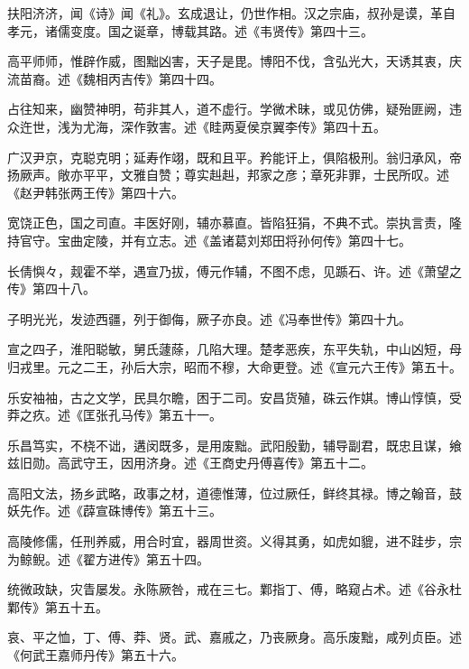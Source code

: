 \documentclass[12pt,UTF8]{ctexbook}
\begin{document}
扶阳济济，闻《诗》闻《礼》。玄成退让，仍世作相。汉之宗庙，叔孙是谟，革自孝元，诸儒变度。国之诞章，博载其路。述《韦贤传》第四十三。



高平师师，惟辟作威，图黜凶害，天子是毘。博阳不伐，含弘光大，天诱其衷，庆流苗裔。述《魏相丙吉传》第四十四。



占往知来，幽赞神明，苟非其人，道不虚行。学微术昧，或见仿佛，疑殆匪阙，违众迕世，浅为尤海，深作敦害。述《眭两夏侯京翼李传》第四十五。



广汉尹京，克聪克明；延寿作翊，既和且平。矜能讦上，俱陷极刑。翁归承风，帝扬厥声。敞亦平平，文雅自赞；尊实赳赳，邦家之彦；章死非罪，士民所叹。述《赵尹韩张两王传》第四十六。



宽饶正色，国之司直。丰医好刚，辅亦慕直。皆陷狂狷，不典不式。崇执言责，隆持官守。宝曲定陵，并有立志。述《盖诸葛刘郑田将孙何传》第四十七。



长倩懙々，觌霍不举，遇宣乃拔，傅元作辅，不图不虑，见踬石、许。述《萧望之传》第四十八。



子明光光，发迹西疆，列于御侮，厥子亦良。述《冯奉世传》第四十九。



宣之四子，淮阳聪敏，舅氏蘧蒢，几陷大理。楚孝恶疾，东平失轨，中山凶短，母归戎里。元之二王，孙后大宗，昭而不穆，大命更登。述《宣元六王传》第五十。



乐安袖袖，古之文学，民具尔瞻，困于二司。安昌货殖，硃云作娸。博山惇慎，受莽之疚。述《匡张孔马传》第五十一。



乐昌笃实，不桡不诎，遘闵既多，是用废黜。武阳殷勤，辅导副君，既忠且谋，飨兹旧勋。高武守王，因用济身。述《王商史丹傅喜传》第五十二。



高阳文法，扬乡武略，政事之材，道德惟薄，位过厥任，鲜终其禄。博之翰音，鼓妖先作。述《薜宣硃博传》第五十三。



高陵修儒，任刑养威，用合时宜，器周世资。义得其勇，如虎如貔，进不跬步，宗为鲸鲵。述《翟方进传》第五十四。



统微政缺，灾眚屡发。永陈厥咎，戒在三七。鄴指丁、傅，略窥占术。述《谷永杜鄴传》第五十五。



哀、平之恤，丁、傅、莽、贤。武、嘉戚之，乃丧厥身。高乐废黜，咸列贞臣。述《何武王嘉师丹传》第五十六。
\end{document}
